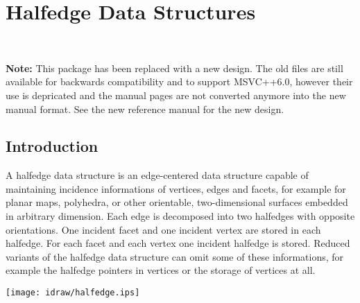 
\ccParDims

\chapter{Halfedge Data Structures}
\label{chapterHds}
\\

{\bf Note:} This package has been replaced with a new design.  The old
files are still available for backwards compatibility and to support
MSVC++6.0, however their use is depricated and the manual pages are
not converted anymore into the new manual format. See the new
reference manual for the new design.


\section{Introduction}

A halfedge data structure is an edge-centered data structure capable
of maintaining incidence informations of vertices, edges and facets,
for example for planar maps, polyhedra, or other orientable,
two-dimensional surfaces embedded in arbitrary dimension. Each edge is
decomposed into two halfedges with opposite orientations. One incident
facet and one incident vertex are stored in each halfedge.  For each
facet and each vertex one incident halfedge is stored.  Reduced
variants of the halfedge data structure can omit some of these
informations, for example the halfedge pointers in vertices or the
storage of vertices at all.

\begin{ccTexOnly}
    \vspace{-4mm}
    \begin{center}
      \parbox{0.4\textwidth}{%
          \texttt{[image: idraw/halfedge.ips]}%
      }
    \end{center}
    \vspace{-3mm}
\end{ccTexOnly}

